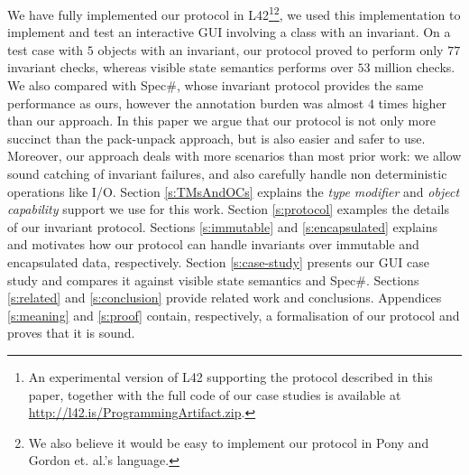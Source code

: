We have fully implemented our protocol in L42\footnote{An experimental version of L42 supporting the protocol described in this paper, together with the full code of our case studies is available at \url{http://l42.is/ProgrammingArtifact.zip}.}\footnote{We also believe it would be easy to implement our protocol in Pony and Gordon et. al.'s language.}, we used this implementation to implement and test an interactive GUI involving a class with an invariant. On a test case with $5$ objects with an invariant, 
our protocol proved to perform only $77$ invariant checks, whereas visible state semantics performs over $53$ million checks. We also compared with Spec\#, whose invariant protocol provides the same performance as ours, however the annotation burden was almost $4$ times higher than our approach.
In this paper we argue that our protocol is not only more succinct than the pack-unpack approach, but is also easier and safer to use.
Moreover, our approach deals with more scenarios than most prior work: we allow sound catching of invariant failures, and also carefully handle non deterministic operations like I/O.
Section \ref{s:TMsAndOCs} explains the \emph{type modifier} and \emph{object capability} support we use for this work.
Section \ref{s:protocol} examples the details of our invariant protocol.
Sections \ref{s:immutable} and \ref{s:encapsulated} explains and motivates how our protocol can handle invariants over immutable and encapsulated data, respectively.
Section \ref{s:case-study} presents our GUI case study and compares it against visible state semantics and Spec\#.
Sections \ref{s:related} and \ref{s:conclusion} provide related work and conclusions.
Appendices \ref{s:meaning} and \ref{s:proof} contain, respectively, a formalisation of our protocol and proves that it is sound.

